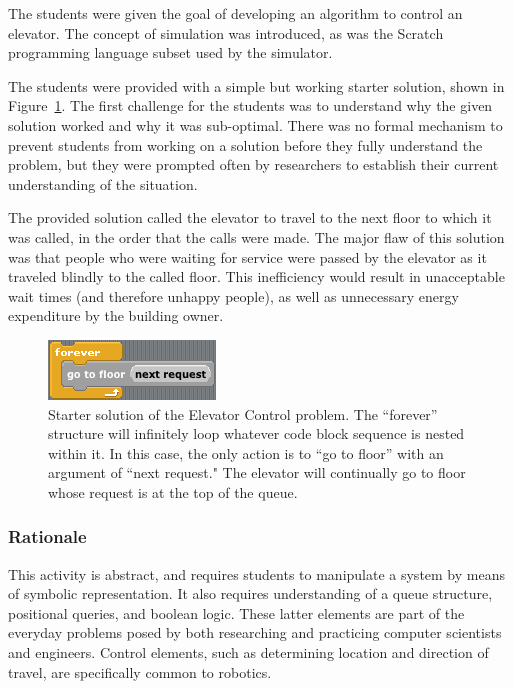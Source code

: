 	The students were given the goal of developing an algorithm to control an elevator. The concept of simulation was introduced, as was the Scratch programming language subset used by the simulator.
	
	The students were provided with a simple but working starter solution,
	shown in Figure~\ref{fig:elevator-trivial}. The first challenge for the students was to understand why the given solution worked and why it was sub-optimal.
	There was no formal mechanism to prevent students from working
	on a solution before they fully understand the problem, but they were prompted often by researchers to establish their current understanding
	of the situation.
	
	The provided solution called the elevator to travel to the next floor to which it was called, in the order that the calls were made. The major flaw of
	this solution was that people who were waiting for service were passed
	by the elevator as it traveled blindly to the called floor. This inefficiency would result in unacceptable wait times (and therefore unhappy people), as well as unnecessary energy expenditure
	by the building owner.
	
	\begin{figure}
	\begin{centering}
	\includegraphics{images/elevator-trivial-solution}
	\par\end{centering}
	\caption[Starter solution of the Elevator Control problem.]{Starter solution of the Elevator Control problem. The ``forever'' structure will infinitely loop whatever code block sequence is nested within it. In this case, the only action is to ``go to floor'' with an argument of ``next request." The elevator will continually go to floor whose request is at the top of the queue.}
	\label{fig:elevator-trivial}
	\end{figure}
	
	\subsubsection{Rationale}
	
	This activity is abstract, and requires students to manipulate a system by means of symbolic representation. It also requires understanding of a queue structure,
	positional queries, and boolean logic. These latter elements are part of
	the everyday problems posed by both researching and practicing computer
	scientists and engineers. Control elements, such as determining location
	and direction of travel, are specifically common to robotics.





